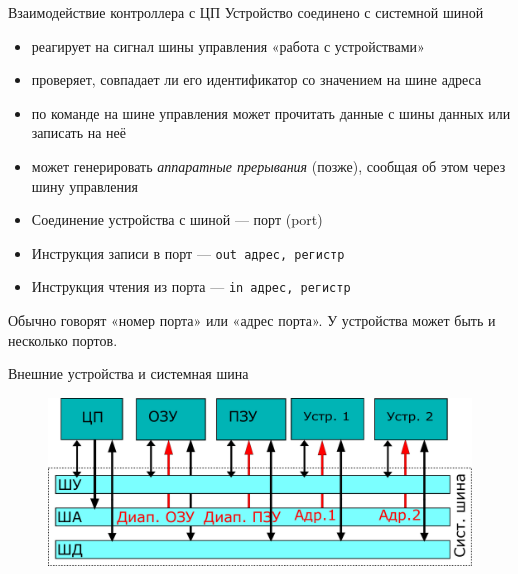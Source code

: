 \documentclass[xetex,aspectratio=43]{beamer}
\begin{document}
\begin{frame}[fragile]{Взаимодействие контроллера с ЦП}
	Устройство соединено с системной шиной

	\begin{itemize}
		\tightlist
		\item
		реагирует на сигнал шины управления «работа с устройствами»
		\item
		проверяет, совпадает ли его идентификатор со значением на шине адреса
		\item
		по команде на шине управления может прочитать данные с шины данных или записать на неё
		\item
		может генерировать \emph{аппаратные прерывания} (позже), сообщая об этом через шину управления
	\end{itemize}


	\begin{itemize}
		\tightlist
		\item
		Соединение устройства с шиной --- порт (port)
		\item
		Инструкция записи в порт --- \texttt{out\ адрес,\ регистр}
		\item
		Инструкция чтения из порта --- \texttt{in\ адрес,\ регистр}
	\end{itemize}


	Обычно говорят «номер порта» или «адрес порта». У устройства может быть
	и несколько портов.
\end{frame}

\begin{frame}{Внешние устройства и системная шина}
    \begin{figure}
    \includegraphics[height=0.5\textheight]{img/03.Von_Neumann_Multiple_Peripherals.pdf}
\end{figure}
\end{frame}
\end{document}
